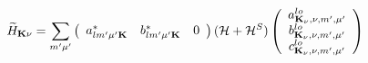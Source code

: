 \documentclass[aps,prb,floatfix,epsfig,singlecolumn,showpacs,preprintnumbers]{revtex4}
\newcommand{\vK}{{\mathbf{K}}}
\newcommand{\cH}{{\cal H}}
\begin{document}
\begin{eqnarray}
\widetilde{H}_{\vK\nu}=\sum_{m'\mu'}
\left(
\begin{array}{ccc}
a^*_{lm'\mu'\vK} & b^*_{lm'\mu'\vK} & 0
\end{array}
\right)(\cH+\cH^S)
\left(
\begin{array}{c}
a^{lo}_{\vK_\nu,\nu,m',\mu'}\\
b^{lo}_{\vK_\nu,\nu,m',\mu'}\\
c^{lo}_{\vK_\nu,\nu,m',\mu'}
\end{array}
\right)
\end{eqnarray}
\end{document}
